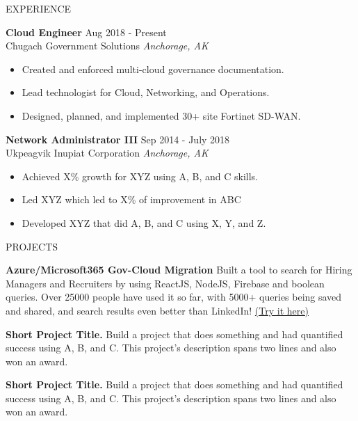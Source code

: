 \documentclass{resume} %
\begin{document}
\begin{rSection}{EXPERIENCE}

\textbf{Cloud Engineer} \hfill Aug 2018 - Present\\
Chugach Government Solutions \hfill \textit{Anchorage, AK}
 \begin{itemize}
    \itemsep -3pt {} 
     \item Created and enforced multi-cloud governance documentation.
     \item Lead technologist for Cloud, Networking, and Operations.
     \item Designed, planned, and implemented 30+ site Fortinet SD-WAN.
 \end{itemize}
 
\textbf{Network Administrator III} \hfill Sep 2014 - July 2018\\
Ukpeagvik Inupiat Corporation \hfill \textit{Anchorage, AK}
 \begin{itemize}
    \itemsep -3pt {} 
     \item Achieved X\% growth for XYZ using A, B, and C skills.
     \item Led XYZ which led to X\% of improvement in ABC
    \item Developed XYZ that did A, B, and C using X, Y, and Z. 
 \end{itemize}

\end{rSection} 


\begin{rSection}{PROJECTS}
\vspace{-1.25em}
\item \textbf{Azure/Microsoft365 Gov-Cloud Migration} {Built a tool to search for Hiring Managers and Recruiters by using ReactJS, NodeJS, Firebase and boolean queries. Over 25000 people have used it so far, with 5000+ queries being saved and shared, and search results even better than LinkedIn! \href{https://hiring-search.careerflow.ai/}{(Try it here)}}
\item \textbf{Short Project Title.} {Build a project that does something and had quantified success using A, B, and C. This project's description spans two lines and also won an award.}
\item \textbf{Short Project Title.} {Build a project that does something and had quantified success using A, B, and C. This project's description spans two lines and also won an award.}
\end{rSection} 
\end{document}
